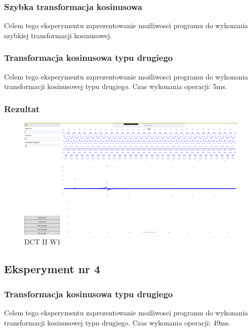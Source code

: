 \documentclass[12pt]{article}
\begin{document}
\subsubsection{Szybka transformacja kosinusowa }
Celem tego eksperymentu zaprezentowanie możliwosci programu do wykonania szybkiej transformacji kosinusowej.
\subsubsection{Transformacja kosinusowa typu drugiego}
Celem tego eksperymentu zaprezentowanie możliwosci programu do wykonania transformacji kosinusowej typu drugiego.
Czas wykonania operacji: 5ms.

\subsubsection{Rezultat}
\begin{figure}[H]
 \centering
 \includegraphics[width=14cm]{images/dctw1.PNG}
 \vspace{-0.3cm}
 \caption{DCT II W1}
 \label{gui}
\end{figure}


\subsection{Eksperyment nr 4 }
\subsubsection{Transformacja kosinusowa typu drugiego}
Celem tego eksperymentu zaprezentowanie możliwosci programu do wykonania transformacji kosinusowej typu drugiego.
Czas wykonania operacji: 49ms.
\end{document}
